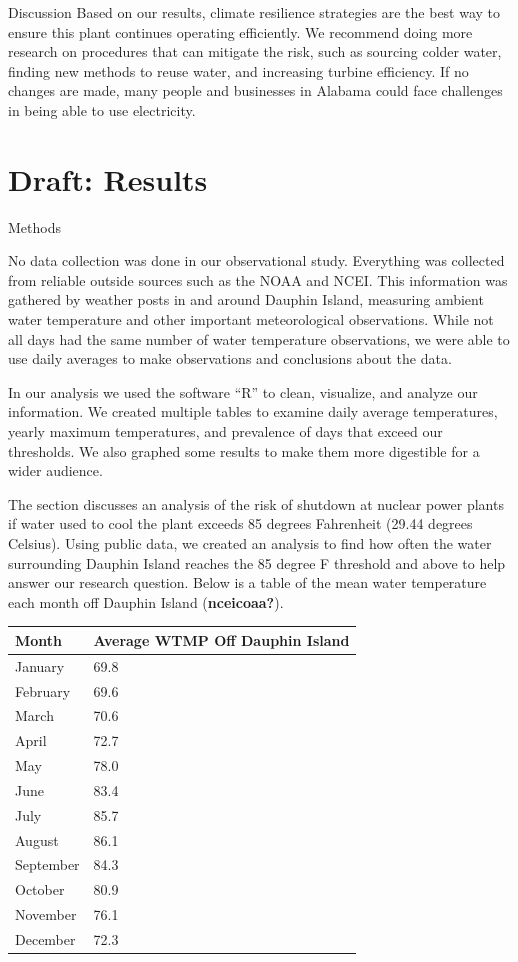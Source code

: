 \documentclass[
  letterpaper,
  DIV=11,
  numbers=noendperiod]{scrreprt}
\begin{document}
Discussion Based on our results, climate resilience strategies are the
best way to ensure this plant continues operating efficiently. We
recommend doing more research on procedures that can mitigate the risk,
such as sourcing colder water, finding new methods to reuse water, and
increasing turbine efficiency. If no changes are made, many people and
businesses in Alabama could face challenges in being able to use
electricity.

\chapter{Draft: Results}\label{draft-results}

Methods

No data collection was done in our observational study. Everything was
collected from reliable outside sources such as the NOAA and NCEI. This
information was gathered by weather posts in and around Dauphin Island,
measuring ambient water temperature and other important meteorological
observations. While not all days had the same number of water
temperature observations, we were able to use daily averages to make
observations and conclusions about the data.

In our analysis we used the software ``R'' to clean, visualize, and
analyze our information. We created multiple tables to examine daily
average temperatures, yearly maximum temperatures, and prevalence of
days that exceed our thresholds. We also graphed some results to make
them more digestible for a wider audience.

The section discusses an analysis of the risk of shutdown at nuclear
power plants if water used to cool the plant exceeds 85 degrees
Fahrenheit (29.44 degrees Celsius). Using public data, we created an
analysis to find how often the water surrounding Dauphin Island reaches
the 85 degree F threshold and above to help answer our research
question. Below is a table of the mean water temperature each month off
Dauphin Island (\textbf{nceicoaa?}).

\begin{longtable}[]{@{}ll@{}}
\toprule\noalign{}
Month & Average WTMP Off Dauphin Island \\
\midrule\noalign{}
\endhead
\bottomrule\noalign{}
\endlastfoot
January & 69.8 \\
February & 69.6 \\
March & 70.6 \\
April & 72.7 \\
May & 78.0 \\
June & 83.4 \\
July & 85.7 \\
August & 86.1 \\
September & 84.3 \\
October & 80.9 \\
November & 76.1 \\
December & 72.3 \\
\end{longtable}
\end{document}
